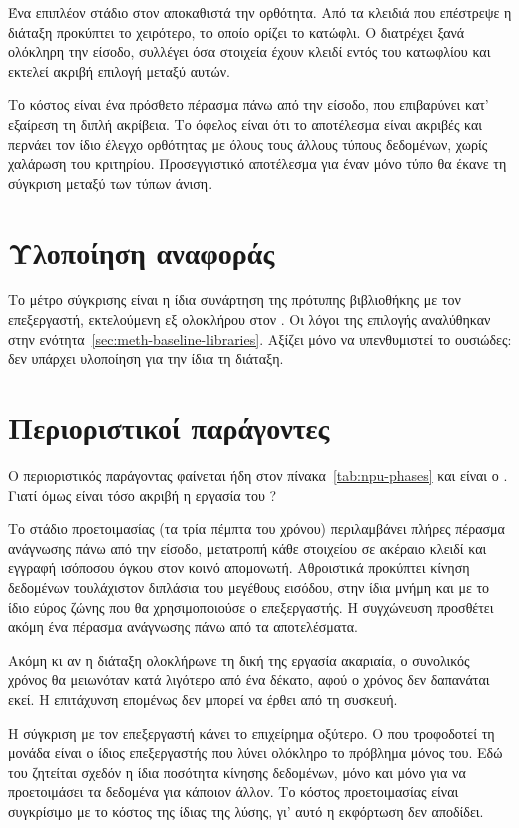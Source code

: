 Ένα επιπλέον στάδιο στον  αποκαθιστά την ορθότητα. Από τα κλειδιά που
επέστρεψε η διάταξη προκύπτει το χειρότερο, το οποίο ορίζει το κατώφλι. Ο
 διατρέχει ξανά ολόκληρη την είσοδο, συλλέγει όσα στοιχεία έχουν
κλειδί εντός του κατωφλίου και εκτελεί ακριβή επιλογή μεταξύ αυτών.

Το κόστος είναι ένα πρόσθετο πέρασμα πάνω από την είσοδο, που επιβαρύνει κατ'
εξαίρεση τη διπλή ακρίβεια. Το όφελος είναι ότι το αποτέλεσμα είναι ακριβές και
περνάει τον ίδιο έλεγχο ορθότητας με όλους τους άλλους τύπους δεδομένων, χωρίς
χαλάρωση του κριτηρίου. Προσεγγιστικό αποτέλεσμα για έναν μόνο τύπο θα έκανε τη
σύγκριση μεταξύ των τύπων άνιση.

\section{Υλοποίηση αναφοράς}
\label{sec:npu-reference}

Το μέτρο σύγκρισης είναι η ίδια συνάρτηση της πρότυπης βιβλιοθήκης με τον
επεξεργαστή, εκτελούμενη εξ ολοκλήρου στον . Οι λόγοι της επιλογής
αναλύθηκαν στην ενότητα~\ref{sec:meth-baseline-libraries}. Αξίζει μόνο να
υπενθυμιστεί το ουσιώδες: δεν υπάρχει υλοποίηση  για την ίδια τη
διάταξη.

\section{Περιοριστικοί παράγοντες}
\label{sec:npu-bottlenecks}

Ο περιοριστικός παράγοντας φαίνεται ήδη στον πίνακα~\ref{tab:npu-phases} και
είναι ο . Γιατί όμως είναι τόσο ακριβή η εργασία του ?

Το στάδιο προετοιμασίας (τα τρία πέμπτα του χρόνου) περιλαμβάνει πλήρες πέρασμα
ανάγνωσης πάνω από την είσοδο, μετατροπή κάθε στοιχείου σε ακέραιο κλειδί και
εγγραφή ισόποσου όγκου στον κοινό απομονωτή. Αθροιστικά προκύπτει κίνηση
δεδομένων τουλάχιστον διπλάσια του μεγέθους εισόδου, στην ίδια μνήμη και με το
ίδιο εύρος ζώνης που θα χρησιμοποιούσε ο επεξεργαστής. Η συγχώνευση προσθέτει
ακόμη ένα πέρασμα ανάγνωσης πάνω από τα αποτελέσματα.

Ακόμη κι αν η διάταξη ολοκλήρωνε τη δική της εργασία ακαριαία, ο συνολικός
χρόνος θα μειωνόταν κατά λιγότερο από ένα δέκατο, αφού ο χρόνος δεν δαπανάται
εκεί. Η επιτάχυνση επομένως δεν μπορεί να έρθει από τη συσκευή.

Η σύγκριση με τον επεξεργαστή κάνει το επιχείρημα οξύτερο. Ο  που
τροφοδοτεί τη μονάδα είναι ο ίδιος επεξεργαστής που λύνει ολόκληρο το πρόβλημα
μόνος του. Εδώ του ζητείται σχεδόν η ίδια ποσότητα κίνησης δεδομένων, μόνο και
μόνο για να προετοιμάσει τα δεδομένα για κάποιον άλλον. Το κόστος προετοιμασίας
είναι συγκρίσιμο με το κόστος της ίδιας της λύσης, γι' αυτό η εκφόρτωση δεν
αποδίδει.

